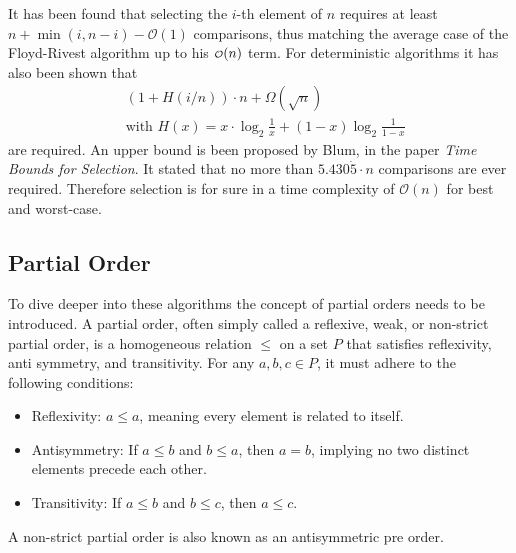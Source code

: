 \documentclass[10pt,journal,compsoc]{IEEEtran}
\newcommand\smallO{
  \mathchoice
    {{\scriptstyle\mathcal{O}}}%
    {{\scriptstyle\mathcal{O}}}%
    {{\scriptscriptstyle\mathcal{O}}}%
    {\scalebox{.50}{$\scriptscriptstyle\mathcal{O}$}}%
  }
\begin{document}
It has been found that selecting the $i$-th element of $n$ requires at least
$n+\min(i,n-i)-\mathcal{O}(1)$ comparisons, thus matching the average case of the Floyd-Rivest
algorithm up to his $\smallO(n)$ term. For deterministic algorithms it has also been shown that
\begin{eqnarray*}
  &\left (1 + H(i/n) \right ) \cdot n + \Omega(\sqrt n) \\
  &\text{with~} H(x) = x \cdot \log_2 \frac{1}{x} + (1-x) \log_2 \frac{1}{1-x}
\end{eqnarray*}
are required. An upper bound is been proposed by Blum, in the paper \textit{Time Bounds for
  Selection}. It stated that no more than $5.430\dot{5} \cdot n$ comparisons are ever required.
Therefore selection is for sure in a time complexity of $\mathcal{O}(n)$ for best and worst-case.

\subsection{Partial Order}
To dive deeper into these algorithms the concept of partial orders needs to be introduced. A partial
order, often simply called a reflexive, weak, or non-strict partial order, is a homogeneous relation
$\leq$ on a set $P$ that satisfies reflexivity, anti symmetry, and transitivity. For any $a, b, c
  \in P$, it must adhere to the following conditions:

\begin{itemize}
  \item Reflexivity: $a \leq a$, meaning every element is related to itself.
  \item Antisymmetry: If $a \leq b$ and $b \leq a$, then $a = b$, implying no two distinct elements
        precede each other.
  \item Transitivity: If $a \leq b$ and $b \leq c$, then $a \leq c$.
\end{itemize}


A non-strict partial order is also known as an antisymmetric pre order.
\end{document}
